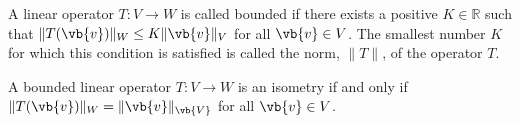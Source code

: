 \documentclass[a4paper,12pt]{report}
\begin{document}
\begin{definition}
    A linear operator \(T:V \to W\) is called bounded if there exists a positive \(K \in \mathbb{R}\) such that \(\lVert T(\vb{v} ) \rVert_{W} \le K \lVert \vb{v}  \rVert_{V}    \) for all \(\vb{v} \in V\). The smallest number \(K\) for which this condition is satisfied is called the norm, \(\lVert T \rVert \), of the operator \(T\).    
\end{definition}

\begin{definition}[Isometries]
    A bounded linear operator \(T:V \to W\) is an isometry if and only if \(\lVert T(\vb{v} ) \rVert_{W} = \lVert \vb{v}  \rVert_{\vb{V} } \) for all \(\vb{v} \in V\).   
\end{definition}
\end{document}
